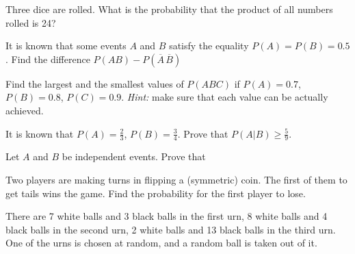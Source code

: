 \documentclass[14pt]{exam}
\begin{document}
\begin{questions}
		
		\question
		Three dice are rolled. What is the probability that the product of all numbers rolled is 24?




				
			
		\question
		It is known that some events $A$ and $B$ satisfy the equality $P(A) = P(B) = 0.5$. Find the difference $P(AB) - P(\overline{A}\, \overline{B})$
		




		
		
		\question
		Find the largest and the smallest values of $P(ABC)$ if $P(A) = 0.7$, $P(B) = 0.8$, $P(C) = 0.9$. \textit{Hint:} make sure that each value can be actually achieved.
		






		
		\question
		It is known that $P(A) = \frac{2}{3}$, $P(B) = \frac{3}{4}$. Prove that $P(A | B) \geq \frac{5}{9}$.
		
		\question
		Let $A$ and $B$ be independent events. Prove that
		
		
		
		
		
		
		\question
		Two players are making turns in flipping a (symmetric) coin. The first of them to get tails wins the game. Find the probability for the first player to lose.
		
		
		
		

		
		\question
		There are 7 white balls and 3 black balls in the first urn, 8 white balls and 4 black balls in the second urn, 2 white balls and 13 black balls in the third urn. One of the urns is chosen at random, and a random ball is taken out of it.
		
\end{questions}
\end{document}
